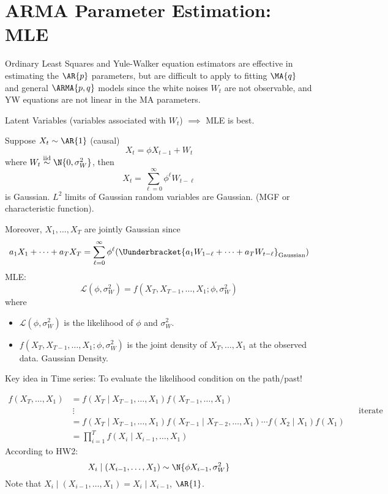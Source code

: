 \section{ARMA Parameter Estimation: MLE}
Ordinary Least Squares and Yule-Walker equation
estimators are effective in estimating the $ \AR{p} $
parameters, but are difficult to apply to fitting
$ \MA{q} $ and general $ \ARMA{p,q} $
models since the white noises $ W_t $ are not observable,
and YW equations are not linear in the MA parameters.

Latent Variables (variables associated with $ W_t $) $\implies$
MLE is best.

Suppose $ X_t \sim \AR{1} $ (causal)
\[ X_t=\phi X_{t-1}+W_t \]
where $ W_t \stackrel{\text{iid}}{\sim}\N{0,\sigma_W^2} $,
then
\[ X_t=\sum_{\ell=0}^{\infty} \phi^\ell W_{t-\ell} \]
is Gaussian. $ L^2 $ limits of Gaussian random variables are Gaussian.
(MGF or characteristic function).

Moreover, $ X_1,\ldots,X_T $ are jointly Gaussian since
\[ a_1X_1+\cdots+a_T X_T= \sum_{\ell=0}^{\infty}
    \phi^\ell (\Uunderbracket{a_1 W_{1-\ell}+\cdots+a_T W_{t-\ell}}_{\text{Gaussian}}) \]
MLE\@:
\[ \mathcal{L}(\phi,\sigma_W^2)=f(X_T, X_{T-1},\ldots,X_1;\phi,\sigma_W^2) \]
where
\begin{itemize}
    \item $\mathcal{L}(\phi,\sigma_W^2)$ is the likelihood of $ \phi $ and $ \sigma_W^2 $.
    \item $f(X_T, X_{T-1},\ldots,X_1;\phi,\sigma_W^2)$ is the joint density
          of $ X_T,\ldots,X_1 $ at the observed data. Gaussian Density.
\end{itemize}
Key idea in Time series: To evaluate the likelihood condition on
the path/past!

\begin{align*}
    f(X_T,\ldots,X_1)
     & =f(X_T\mid X_{T-1},\ldots,X_1)f(X_{T-1},\ldots,X_1)                                                            \\
     & \:\vdots                                                                                   &  & \text{iterate} \\
     & =f(X_T\mid X_{T-1},\ldots,X_1)f(X_{T-1}\mid X_{T-2},\ldots,X_1)\cdots f(X_2\mid X_1)f(X_1)                     \\
     & =\prod_{i=1}^T f(X_i\mid X_{i-1},\ldots,X_1)
\end{align*}
According to HW2:
\[ X_i \mid (X_{i-1},\ldots,X_1)\sim \N{\phi X_{i-1},\sigma_W^2} \]
Note that $  X_i \mid (X_{i-1},\ldots,X_1)=X_i\mid X_{i-1} $, $ \AR{1} $.

